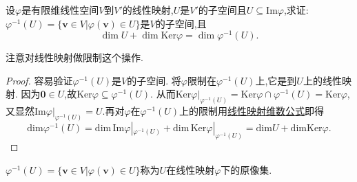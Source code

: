 \documentclass[lang=cn,newtx,10pt,scheme=chinese]{elegantbook}
\begin{document}
\begin{example}
设\(\varphi\)是有限维线性空间\(V\)到\(V'\)的线性映射,\(U\)是\(V'\)的子空间且\(U\subseteq\text{Im}\varphi\),求证:\(\varphi^{-1}(U)=\{\boldsymbol{v}\in V|\varphi(\boldsymbol{v})\in U\}\)是\(V\)的子空间,且
\[
\dim U+\dim\text{Ker}\varphi=\dim\varphi^{-1}(U).
\]
\end{example}
\begin{note}
注意对线性映射做限制这个操作.
\end{note}
\begin{proof}
容易验证\(\varphi^{-1}(U)\)是\(V\)的子空间. 将\(\varphi\)限制在\(\varphi^{-1}(U)\)上,它是到\(U\)上的线性映射. 因为\(\boldsymbol{0}\in U\),故\(\text{Ker}\varphi\subseteq\varphi^{-1}(U)\). 从而$\text{Ker}\varphi |_{\varphi ^{-1}\left( U \right)}=\mathrm{Ker}\varphi \cap \varphi ^{-1}\left( U \right) =\mathrm{Ker}\varphi $,又显然$\text{Im}\varphi |_{\varphi ^{-1}\left( U \right)}=U$.再对\(\varphi\)在\(\varphi^{-1}(U)\)上的限制用\hyperref[proposition:值域和核空间维数之和等于原像空间维数]{线性映射维数公式}即得
\[
\mathrm{dim}\varphi ^{-1}\left( U \right) =\mathrm{dim}\,\mathrm{Im}\varphi |_{\varphi ^{-1}\left( U \right)}+\mathrm{dim}\,\mathrm{Ker}\varphi |_{\varphi ^{-1}\left( U \right)}=\mathrm{dim}U+\mathrm{dimKer}\varphi .
\]
\end{proof}
\begin{remark}
\(\varphi^{-1}(U)=\{\boldsymbol{v}\in V|\varphi(\boldsymbol{v})\in U\}\)称为$U$在线性映射$\varphi$下的原像集.
\end{remark}
\end{document}
